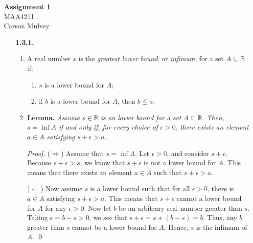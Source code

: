 \documentclass[11pt,letterpaper]{article}
\newcommand{\R}{\mathbb{R}}
\begin{document}
\begin{center}
    \begin{large}
        \textbf{Assignment 1} \\
        MAA4211 \\
        Carson Mulvey
    \end{large}
\end{center}

\begin{enumerate}
\item[\textbf{1.3.1.}]
    \begin{enumerate}
        \item A real number $s$ is the \textit{greatest lower bound}, or \textit{infimum}, for a set $A \subseteq \R$ if:
        \begin{enumerate}
            \item $s$ is a lower bound for $A$;
            \item if $b$ is a lower bound for $A$, then $b \leq s$.
        \end{enumerate}
        \item \textbf{Lemma.} \textit{Assume $s \in \R$ is an lower bound for a set $A \subseteq \R$. Then, $s = \inf A$ if and only if, for every choice of $\epsilon > 0$, there exists an element $a \in A$ satisfying $s + \epsilon > a$.}
        
        \textit{Proof.} ($\Rightarrow$) Assume that $s = \inf A$. Let $\epsilon>0$, and consider $s+\epsilon$. Because $s+\epsilon > s$, we know that $s+\epsilon$ is not a lower bound for $A$. This means that there exists an element $a\in A$ such that $s+\epsilon > a$.

        ($\Leftarrow$) Now assume $s$ is a lower bound such that for all $\epsilon > 0$, there is $a\in A$ satisfying $s+\epsilon > a$. This means that $s+\epsilon$ cannot a lower bound for $A$ for any $\epsilon > 0$. Now let $b$ be an arbitrary real number greater than $s$. Taking $\epsilon = b-s > 0$, we see that $s+\epsilon = s + (b-s) = b$. Thus, any $b$ greater than $s$ cannot be a lower bound for $A$. Hence, $s$ is the infimum of $A$.
        \qed
    \end{enumerate}


\end{enumerate}
\end{document}
